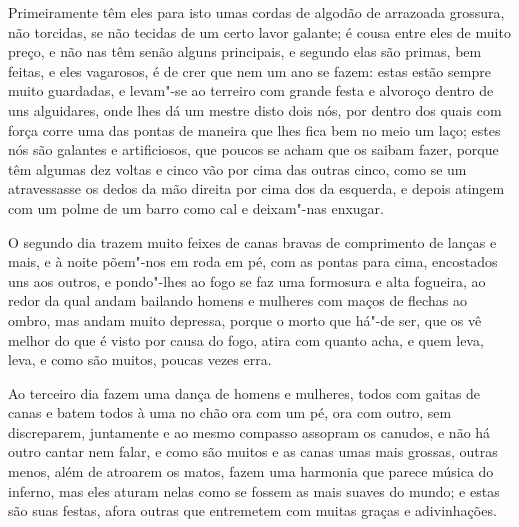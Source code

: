  Primeiramente têm eles para isto umas cordas de algodão de arrazoada
grossura, não torcidas, se não tecidas de um certo lavor galante; é
cousa entre eles de muito preço, e não nas têm senão alguns principais,
e segundo elas são primas, bem feitas, e eles vagarosos, é de crer que
nem um ano se fazem: estas estão sempre muito guardadas, e levam"-se ao
terreiro com grande festa e alvoroço dentro de uns alguidares, onde
lhes dá um mestre disto dois nós, por dentro dos quais com força corre
uma das pontas de maneira que lhes fica bem no meio um laço; estes nós
são galantes e artificiosos, que poucos se acham que os saibam fazer,
porque têm algumas dez voltas e cinco vão por cima das outras cinco,
como se um atravessasse os dedos da mão direita por cima dos da
esquerda, e depois atingem com um polme de um barro como cal e
deixam"-nas enxugar.

 O segundo dia trazem muito feixes de canas bravas de comprimento de 
lanças e mais, e à noite põem"-nos em roda em pé, com as pontas para
cima, encostados uns aos outros, e pondo"-lhes ao fogo se faz uma
formosura e alta fogueira, ao redor da qual andam bailando homens e
mulheres com maços de flechas ao ombro, mas andam muito depressa,
porque o morto que há"-de ser, que os vê melhor do que é visto por causa
do fogo, atira com quanto acha, e quem leva, leva, e como são muitos,
poucas vezes erra.

 Ao terceiro dia fazem uma dança de homens e mulheres, todos com gaitas
de canas e batem todos à uma no chão ora com um pé, ora com outro, sem
discreparem, juntamente e ao mesmo compasso assopram os canudos, e não
há outro cantar nem falar, e como são muitos e as canas umas mais
grossas, outras menos, além de atroarem os matos, fazem uma harmonia
que parece música do inferno, mas eles aturam nelas como se fossem as
mais suaves do mundo; e estas são suas festas, afora outras que
entremetem com muitas graças e adivinhações.

